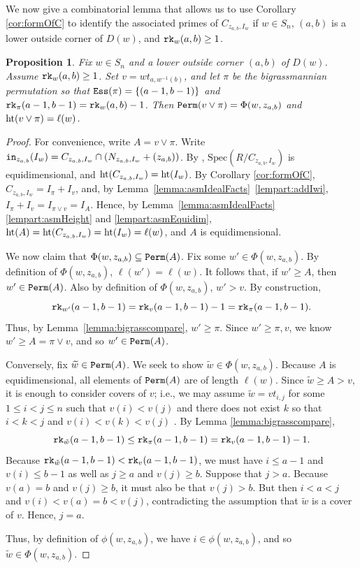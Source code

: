 \documentclass[12pt,reqno]{amsart}
\newtheorem{proposition}[theorem]{Proposition}
\newtheorem{Main Conjecture}[theorem]{Main Conjecture}
\theoremstyle{remark}
\theoremstyle{plain}
\newcommand{\init}{{\tt in}}
\newcommand{\hgt}{{\rm{ht }}}
\newcommand{\ess}{{\tt Ess}}
\newcommand{\perm}{{\tt Perm}}
\newcommand{\rk}{{\tt rk}}
\newcommand{\spec}{{\mbox{Spec}}}
\begin{document}
We now give a combinatorial lemma that allows us to use Corollary \ref{cor:formOfC} to identify the associated primes of $C_{z_{a,b},I_w}$ if $w \in S_n$, $(a,b)$ is a lower outside corner of $D(w)$, and $\rk_w(a,b)\geq 1$.

 \begin{proposition}
\label{prop:ASMdecomp}
Fix $w \in S_n$ and a lower outside corner $(a,b)$ of $D(w)$.  
 Assume $\rk_w(a,b)\geq 1$.
 Set $v=wt_{a,w^{-1}(b)}$, and let $\pi$ be the bigrassmannian permutation so that $\ess(\pi)=\{(a-1,b-1)\}$ and $\rk_\pi(a-1,b-1)=\rk_w(a,b)-1$. 
	Then $\perm(v \vee \pi)=\Phi(w,z_{a,b})$ and $\hgt(v \vee \pi)=\ell(w)$.
\end{proposition}

\begin{proof}
For convenience, write $A=v \vee \pi$.
Write $\init_{z_{a,b}} (I_w) = C_{z_{a,b},I_w} \cap (N_{z_{a,b},I_w}+(z_{a,b}))$.  By \cite[Lemma 2.8]{KR}, $\spec(R/C_{z_{a,b},I_w})$ is equidimensional, and $\hgt (C_{z_{a,b},I_w}) = \hgt (I_w)$.  By Corollary \ref{cor:formOfC}, $C_{z_{a,b},I_w} = I_{\pi} + I_v$, and, by Lemma~\ref{lemma:asmIdealFacts}~\ref{lempart:addIwi}, $I_{\pi} + I_v = I_{\pi \vee v} = I_A$.  Hence, by Lemma~\ref{lemma:asmIdealFacts}\ref{lempart:asmHeight} and \ref{lempart:asmEquidim}, $\hgt(A)   = \hgt (C_{z_{a,b},I_w}) = \hgt (I_w) = \ell(w)$, and $A$ is equidimensional.  

We now claim that $\Phi(w,z_{a,b}) \subseteq \perm(A)$.  Fix some $w'\in \Phi(w,z_{a,b})$.  By definition of $\Phi(w,z_{a,b})$, $\ell(w') = \ell(w)$.  It follows that, if $w' \geq A$, then $w' \in \perm(A)$.  Also by definition of $\Phi(w,z_{a,b})$, $w'>v$.  By construction, \[\rk_{w'}(a-1,b-1)=\rk_v(a-1,b-1)-1=\rk_\pi(a-1,b-1).\]  Thus, by Lemma~\ref{lemma:bigrasscompare}, $w' \geq \pi$.  Since $w' \geq \pi,v$, we know $w' \geq A=\pi\vee v$, and so $w' \in \perm(A)$.


  Conversely, fix $\widetilde{w}\in \perm(A)$.  We seek to show  $\widetilde{w}\in \Phi(w,z_{a,b})$.  Because $A$ is equidimensional, all elements of $\perm(A)$ are of length $\ell(w)$. Since $\widetilde{w}\geq A>v$, it is enough to consider covers of $v$; i.e., we may assume $\widetilde{w}=vt_{i,j}$ for some $1\leq i<j\leq n$ such that $v(i)<v(j)$ and there does not exist $k$ so that $i<k<j$ and $v(i)<v(k)<v(j)$ \cite[Lemma 2.1.4]{BB05}. 
  By Lemma \ref{lemma:bigrasscompare}, \[\rk_{\tilde{w}}(a-1,b-1)\leq \rk_\pi(a-1,b-1)  = \rk_v(a-1,b-1)-1.\]  Because $\rk_{\tilde{w}}(a-1,b-1)<\rk_v(a-1,b-1)$, we must have $i\leq a-1$ and $v(i) \leq b-1$ as well as $j\geq a$ and $v(j) \geq b$.  Suppose that $j>a$.  Because $v(a) = b$ and $v(j) \geq b$, it must also be that $v(j)>b$.  But then $i<a<j$ and $v(i)<v(a)=b<v(j)$, contradicting the assumption that $\widetilde{w}$ is a cover of $v$.  Hence, $j=a$.  
  
  Thus, by definition of $\phi(w,z_{a,b})$, we have $i\in \phi(w,z_{a,b})$, and so $\tilde{w}\in \Phi(w,z_{a,b})$.
\end{proof}
\end{document}
